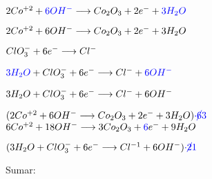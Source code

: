 \documentclass[../practica.root.tex]{subfiles}
\begin{document}
\begin{enumerate}
\begin{enumerate}
\begin{itemize}
\begin{multicols}{2}

                                  $2 Co^{+2} + \textcolor{blue}{6 OH^-} \longrightarrow{} Co_2O_3 + 2 e^- + \textcolor{blue}{3H_2O}$


                                  $2 Co^{+2} + 6 OH^- \longrightarrow{} Co_2O_3 + 2 e^- + 3 H_2O$

                                  \columnbreak

                                  $ClO_3^- + 6 e^- \longrightarrow{} Cl^-$


                                  $\textcolor{blue}{3H_2O} + ClO_3^- + 6 e^- \longrightarrow{} Cl^- + \textcolor{blue}{6OH^-}$


                                  $3 H_2O + ClO_3^- + 6 e^- \longrightarrow{} Cl^- + 6 OH^-$
                              \end{multicols}
                              \begin{multicols}{2}
                                  $(2 Co^{+2} + 6 OH^- \longrightarrow{} Co_2O_3 + 2 e^- + 3 H_2O)\textcolor{blue}{\cdot\cancel{6}{3}}$ \\
                                  $6 Co^{+2} + 18 OH^- \longrightarrow{} 3 Co_2O_3 + \textcolor{blue}{6} e^- + 9 H_2O$

                                  \columnbreak

                                  $(3 H_2O + ClO_3^- + 6 e^- \longrightarrow{} Cl^{-1} + 6 OH^-)\textcolor{blue}{\cdot\cancel{2}{1}}$
                              \end{multicols}
                              Sumar:


\end{itemize}
\end{enumerate}
\end{enumerate}
\end{document}
